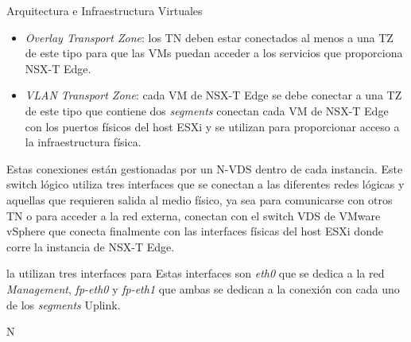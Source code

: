 \begin{subsection}{Arquitectura e Infraestructura Virtuales\cite{CFVirtInfraes}}
\begin{itemize}
  \item \textit{Overlay Transport Zone}: los TN deben estar conectados al menos a una TZ de este tipo para que las VMs puedan acceder a los servicios que proporciona NSX-T Edge.
  
  \item \textit{VLAN Transport Zone}: cada VM de NSX-T Edge se debe conectar a una TZ de este tipo que contiene dos \textit{segments} conectan cada VM de NSX-T Edge con los puertos físicos del host ESXi y se utilizan para proporcionar acceso a la infraestructura física.
\end{itemize}

Estas conexiones están gestionadas por un N-VDS dentro de cada instancia. Este switch lógico utiliza tres interfaces que se conectan a las diferentes redes lógicas y aquellas que requieren salida al medio físico, ya sea para comunicarse con otros TN o para acceder a la red externa, conectan con el switch VDS de VMware vSphere que conecta finalmente con las interfaces físicas del host ESXi donde corre la instancia de NSX-T Edge.

la utilizan tres interfaces para  Estas interfaces son \textit{eth0} que se dedica a la red \textit{Management}, \textit{fp-eth0} y \textit{fp-eth1} que ambas se dedican a la conexión con cada uno de los \textit{segments} Uplink. 





N


\end{subsection}

